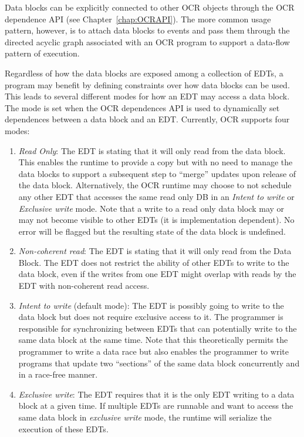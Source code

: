 Data blocks can be explicitly connected to other OCR objects through the OCR
dependence API (see Chapter~\ref{chap:OCRAPI}).
The more common usage pattern, however, is
to attach data blocks to events and pass them through the
directed acyclic graph associated with an OCR program to support a
data-flow pattern of execution.

Regardless of how the data blocks are exposed among a collection of
EDTs, a program may benefit by defining constraints over how data
blocks can be used.  This leads to several different modes for how an
EDT may access a data block.  The mode is set when the OCR dependences
API is used to dynamically set dependences between a data block and an
EDT. Currently, OCR supports four modes:
\begin{enumerate}
\item \emph{Read Only}: The EDT is
stating that it will only read from the data block. This enables the
runtime to provide a copy but with no need to manage the data blocks
to support a subsequent step to ``merge'' updates upon release of the
data block. Alternatively, the OCR runtime may choose to not schedule
any other EDT that accesses the same read only DB in an \emph{Intent
to write} or \emph{Exclusive write} mode. Note that a write to a read
only data block may or may not become visible to other EDTs (it is
implementation dependent). No error will be flagged but the resulting
state of the data block is undefined.
%
%

\item \emph{Non-coherent read}: The EDT
is stating that it will only read from the Data Block. The EDT does
not restrict the ability of other EDTs to write to the data block,
even if the writes from one EDT might overlap with reads by the EDT
with non-coherent read access.

\item \emph{Intent to write} (default mode): The EDT is possibly going to write to the data block but
does not require exclusive access to it. The programmer is
responsible for synchronizing between EDTs that can potentially write
to the same data block at the same time. Note that this theoretically
permits the programmer to write a data race but also enables the
programmer to write programs that update two ``sections'' of the same
data block concurrently and in a race-free manner.

\item \emph{Exclusive write}: The
EDT requires that it is the only EDT writing to a data block at a
given time. If multiple EDTs are runnable and want to access the same
data block in \emph{exclusive write} mode, the runtime will serialize
the execution of these EDTs.
\end{enumerate}

